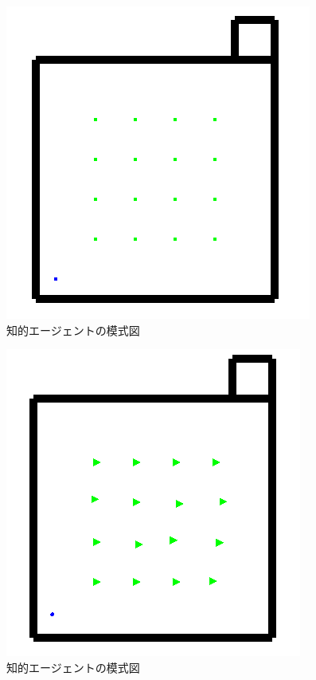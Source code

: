 \begin{figure}[htb]
\begin{center}
 \includegraphics[scale=0.6]{figures/elderly_v1.png}
 \caption[知的エージェントの模式図]{知的エージェントの模式図 \label{elderly_v1}}
\end{center}
\end{figure}

\begin{figure}[htb]
\begin{center}
 \includegraphics[scale=0.6]{figures/elderly_v2.png}
 \caption[知的エージェントの模式図]{知的エージェントの模式図 \label{elderly_v2}}
\end{center}
\end{figure}

